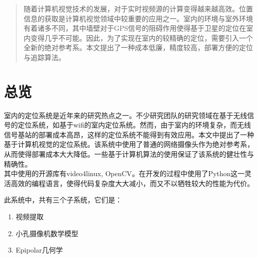 \begin{abstract}
随着计算机视觉技术的发展，对于实时视频源的计算变得越来越高效。位置信息的获取是计算机视觉领域中较重要的应用之一。室内的环境与室外环境有着诸多不同，其中墙壁对于GPS信号的阻碍作用使得基于卫星的定位在室内变得几乎不可能。因此，为了实现在室内的较精确的定位，需要引入一个全新的绝对参考系。本文提出了一种成本低廉，精度较高，部署方便的定位与追踪算法。
\end{abstract}
\newpage
\tableofcontents
\newpage
\section{总览}
室内的定位系统是近年来的研究热点之一。不少研究团队的研究领域在基于无线信号的定位系统，如基于wifi的室内定位系统\cite{cite1}。然而，由于室内的环境复杂，而无线信号基站的部署成本高昂，这样的定位系统不能得到有效应用。本文中提出了一种基于计算机视觉的定位系统。该系统中使用了普通的网络摄像头作为绝对参考系，从而使得部署成本大大降低。一些基于计算机算法的使用保证了该系统的健壮性与精确性。\\

其中使用的开源库有video4linux\cite{cite2}, OpenCV\cite{cite3}。在开发的过程中使用了Python这一灵活高效的编程语言，使得代码复杂度大大减小，而又不以牺牲较大的性能为代价。

此系统中，共有三个子系统，它们是：
\begin{enumerate}
  \item 视频提取
  \item 小孔摄像机数学模型
  \item Epipolar几何学
\end{enumerate}
